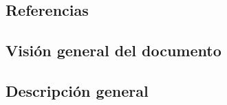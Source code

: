 \documentclass{article}
\begin{document}







    \subsection{Referencias}








    \subsection{Visión general del documento}








    \subsection{Descripción general}
\end{document}
